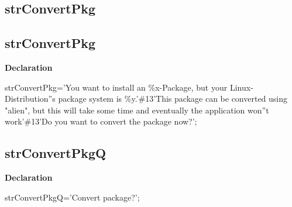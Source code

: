 \documentclass{report}
\newif\ifpdf
\begin{document}
\subsection*{\large{\textbf{strConvertPkg}}\normalsize\hspace{1ex}\hrulefill}
\else
\subsection*{strConvertPkg}
\fi
\label{trstrings-strConvertPkg}
\begin{list}{}{
\setlength{\itemindent}{0cm}
\setlength{\listparindent}{0cm}
\setlength{\leftmargin}{\evensidemargin}
\addtolength{\leftmargin}{\tmplength}
\settowidth{\labelsep}{X}
\addtolength{\leftmargin}{\labelsep}
\setlength{\labelwidth}{\tmplength}
}
\item[\textbf{Declaration}\hfill]
\ifpdf
\begin{flushleft}
\fi
\begin{ttfamily}
strConvertPkg='You want to install an {\%}x-Package, but your Linux-Distribution''s package system is {\%}y.'{\#}13'This package can be converted using "alien", but this will take some time and eventually the application won''t work'{\#}13'Do you want to convert the package now?';\end{ttfamily}

\ifpdf
\end{flushleft}
\fi

\end{list}
\ifpdf
\subsection*{\large{\textbf{strConvertPkgQ}}\normalsize\hspace{1ex}\hrulefill}
\else
\subsection*{strConvertPkgQ}
\fi
\label{trstrings-strConvertPkgQ}
\begin{list}{}{
\setlength{\itemindent}{0cm}
\setlength{\listparindent}{0cm}
\setlength{\leftmargin}{\evensidemargin}
\addtolength{\leftmargin}{\tmplength}
\settowidth{\labelsep}{X}
\addtolength{\leftmargin}{\labelsep}
\setlength{\labelwidth}{\tmplength}
}
\item[\textbf{Declaration}\hfill]
\ifpdf
\begin{flushleft}
\fi
\begin{ttfamily}
strConvertPkgQ='Convert package?';\end{ttfamily}

\ifpdf
\end{flushleft}
\fi

\end{list}
\ifpdf
\end{document}
